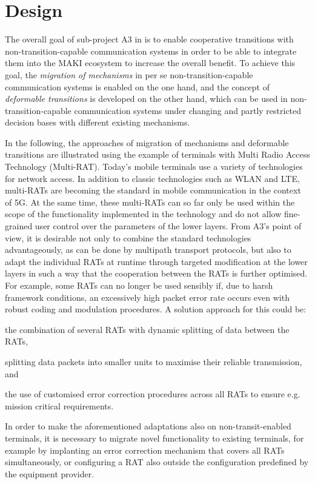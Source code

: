 \section{Design}

The overall goal of sub-project A3 in  is to enable cooperative transitions with non-transition-capable communication systems in order to be able to integrate them into the MAKI ecosystem to increase the overall benefit. 
To achieve this goal, the \emph{migration of mechanisms} in per se non-transition-capable communication systems is enabled on the one hand, and the concept of \emph{deformable transitions} is developed on the other hand, 
which can be used in non-transition-capable communication systems under changing and partly restricted decision bases with different existing mechanisms.

In the following, the approaches of migration of mechanisms and deformable transitions are illustrated using the example of terminals with Multi Radio Access Technology (Multi-RAT).
Today's mobile terminals use a variety of technologies for network access.
In addition to classic technologies such as WLAN and LTE, multi-RATs are becoming the standard in mobile communication in the context of 5G. 
At the same time, these multi-RATs can so far only be used within the scope of the functionality implemented in the technology and do not allow fine-grained user control over the parameters of the lower layers.
From A3's point of view, it is desirable not only to combine the standard technologies advantageously, as can be done by multipath transport protocols, but also to adapt the individual RATs at runtime through targeted modification at the lower layers in such a way that the cooperation between the RATs is further optimised. 
For example, some RATs can no longer be used sensibly if, due to harsh framework conditions, an excessively high packet error rate occurs even with robust coding and modulation procedures. A solution approach for this could be:
\begin{itemizeInline}
\item the combination of several RATs with dynamic splitting of data between the RATs,
\item splitting data packets into smaller units to maximise their reliable transmission, and 
\item the use of customised error correction procedures across all RATs to ensure e.g. mission critical requirements.
\end{itemizeInline}
In order to make the aforementioned adaptations also on non-transit-enabled terminals, it is necessary to migrate novel functionality to existing terminals, for example by implanting an error correction mechanism that covers all RATs simultaneously, or configuring a RAT also outside the configuration predefined by the equipment provider. 


